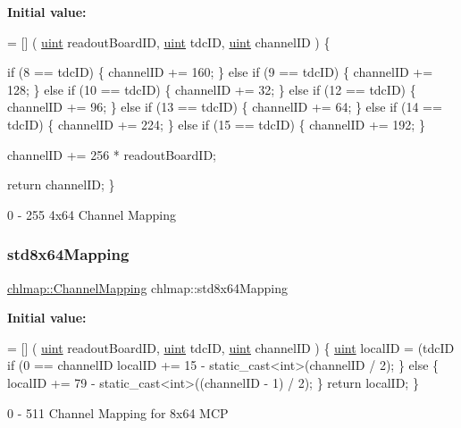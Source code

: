{\bfseries Initial value\+:}
\begin{DoxyCode}
= [] (
    \hyperlink{_channel_mappings_8cpp_a69aa29b598b851b0640aa225a9e5d61d}{uint} readoutBoardID,
    \hyperlink{_channel_mappings_8cpp_a69aa29b598b851b0640aa225a9e5d61d}{uint} tdcID,
    \hyperlink{_channel_mappings_8cpp_a69aa29b598b851b0640aa225a9e5d61d}{uint} channelID
) \{
    
    
    \textcolor{keywordflow}{if} (8 == tdcID) \{
        channelID += 160;
    \} \textcolor{keywordflow}{else} \textcolor{keywordflow}{if} (9 == tdcID) \{
        channelID += 128;
    \} \textcolor{keywordflow}{else} \textcolor{keywordflow}{if} (10 == tdcID) \{
        channelID += 32;
    \} \textcolor{keywordflow}{else} \textcolor{keywordflow}{if} (12 == tdcID) \{
        channelID += 96;
    \} \textcolor{keywordflow}{else} \textcolor{keywordflow}{if} (13 == tdcID) \{
        channelID += 64;
    \} \textcolor{keywordflow}{else} \textcolor{keywordflow}{if} (14 == tdcID) \{
        channelID += 224;
    \} \textcolor{keywordflow}{else} \textcolor{keywordflow}{if} (15 == tdcID) \{
        channelID += 192;
    \}

    channelID += 256 * readoutBoardID;

    \textcolor{keywordflow}{return} channelID;
\}
\end{DoxyCode}


0 -\/ 255 4x64 Channel Mapping 

\mbox{\label{namespacechlmap_a11d7121de30a32ead9032c59221b7442}} 
\subsubsection{\texorpdfstring{std8x64\+Mapping}{std8x64Mapping}}
{\footnotesize\ttfamily \hyperlink{namespacechlmap_aeed247fbd4770834005177ddb2712668}{chlmap\+::\+Channel\+Mapping} chlmap\+::std8x64\+Mapping}

{\bfseries Initial value\+:}
\begin{DoxyCode}
= [] (
    \hyperlink{_channel_mappings_8cpp_a69aa29b598b851b0640aa225a9e5d61d}{uint} readoutBoardID,
    \hyperlink{_channel_mappings_8cpp_a69aa29b598b851b0640aa225a9e5d61d}{uint} tdcID,
    \hyperlink{_channel_mappings_8cpp_a69aa29b598b851b0640aa225a9e5d61d}{uint} channelID
) \{
    \hyperlink{_channel_mappings_8cpp_a69aa29b598b851b0640aa225a9e5d61d}{uint} localID = (tdcID%
    \textcolor{keywordflow}{if} (0 == channelID%
        localID += 15 - \textcolor{keyword}{static\_cast<}\textcolor{keywordtype}{int}\textcolor{keyword}{>}(channelID / 2); 
    \} \textcolor{keywordflow}{else} \{
        localID += 79 - \textcolor{keyword}{static\_cast<}\textcolor{keywordtype}{int}\textcolor{keyword}{>}((channelID - 1) / 2); 
    \}
    \textcolor{keywordflow}{return} localID;
\}
\end{DoxyCode}


0 -\/ 511 Channel Mapping for 8x64 M\+CP 

